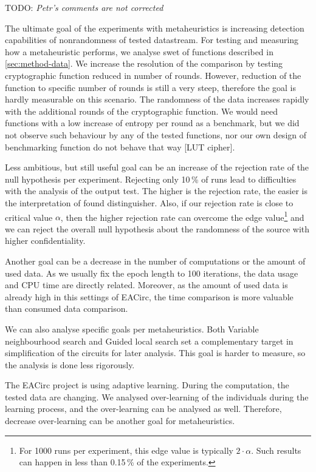 \documentclass[
  print, %
  Table,   %
  nolof,     %
  nolot,     %
  11pt, %
  oneside  %
]{fithesis3}
\newcommand{\todo}[1]{TODO: \textit{#1}}
\begin{document}
\todo{Petr's comments are not corrected}

The ultimate goal of the experiments with metaheuristics is increasing detection capabilities of nonrandomness of tested datastream. For testing and measuring how a metaheuristic performs, we analyse swet of functions described in \cref{sec:method-data}. We increase the resolution of the comparison by testing cryptographic function reduced in number of rounds. However, reduction of the function to specific number of rounds is still a very steep, therefore the goal is hardly measurable on this scenario. The randomness of the data increases rapidly with the additional rounds of the cryptographic function. We would need functions with a low increase of entropy per round as a benchmark, but we did not observe such behaviour by any of the tested functions, nor our own design of benchmarking function do not behave that way [LUT cipher].

Less ambitious, but still useful goal can be an increase of the rejection rate of the null hypothesis per experiment. Rejecting only 10\,\% of runs lead to difficulties with the analysis of the output test. The higher is the rejection rate, the easier is the interpretation of found distinguisher. Also, if our rejection rate is close to critical value $\alpha$, then the higher rejection rate can overcome the edge value\footnote{For 1000 runs per experiment, this edge value is typically $2\cdot\alpha$. Such results can happen in less than 0.15\,\% of the experiments.} and we can reject the overall null hypothesis about the randomness of the source with higher confidentiality.

Another goal can be a decrease in the number of computations or the amount of used data. As we usually fix the epoch length to 100 iterations, the data usage and CPU time are directly related. Moreover, as the amount of used data is already high in this settings of EACirc, the time comparison is more valuable than consumed data comparison.

We can also analyse specific goals per metaheuristics. Both Variable neighbourhood search and Guided local search set a complementary target in simplification of the circuits for later analysis. This goal is harder to measure, so the analysis is done less rigorously.

The EACirc project is using adaptive learning. During the computation, the tested data are changing. We analysed over-learning of the individuals during the learning process, and the over-learning can be analysed as well. Therefore, decrease over-learning can be another goal for metaheuristics.
\end{document}
